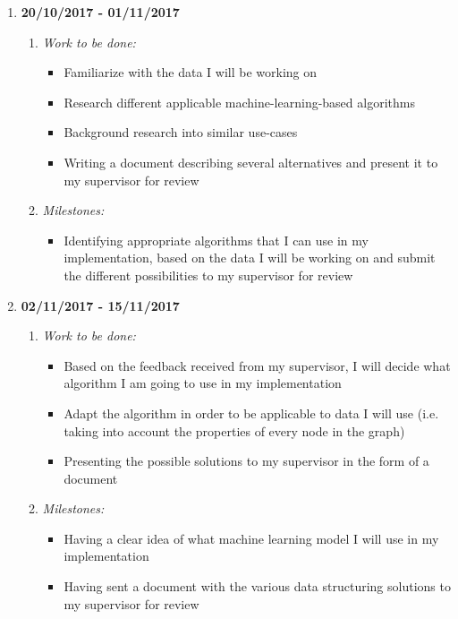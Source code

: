 \begin{enumerate}
	\item  \textbf{20/10/2017 - 01/11/2017}
		\begin{enumerate}
			\item \emph{Work to be done:}
				\begin{itemize}
					\item Familiarize with the data I will be working on
					\item Research different applicable machine-learning-based algorithms
					\item Background research into similar use-cases
					\item Writing a document describing several alternatives and present it to my supervisor for review
				\end{itemize}
			\item \emph{Milestones:}
				\begin{itemize}
					\item Identifying appropriate algorithms that I can use in my implementation, based on the data I will be working on and submit the different possibilities to my supervisor for review
				\end{itemize}
		\end{enumerate}
	
	\vspace{5mm}
	
	\item \textbf{02/11/2017 - 15/11/2017}
		\begin{enumerate}
			\item \emph{Work to be done:}
				\begin{itemize}
					\item Based on the feedback received from my supervisor, I will decide what algorithm I am going to use in my implementation
					\item Adapt the algorithm in order to be applicable to data I will use (i.e. taking into account the properties of every node in the graph)
					\item Presenting the possible solutions to my supervisor in the form of a document
				\end{itemize}
			\item \emph{Milestones:}
				\begin{itemize}
					\item Having a clear idea of what machine learning model I will use in my implementation
					\item Having sent a document with the various data structuring solutions to my supervisor for review
				\end{itemize}
		\end{enumerate}
	

\end{enumerate}
